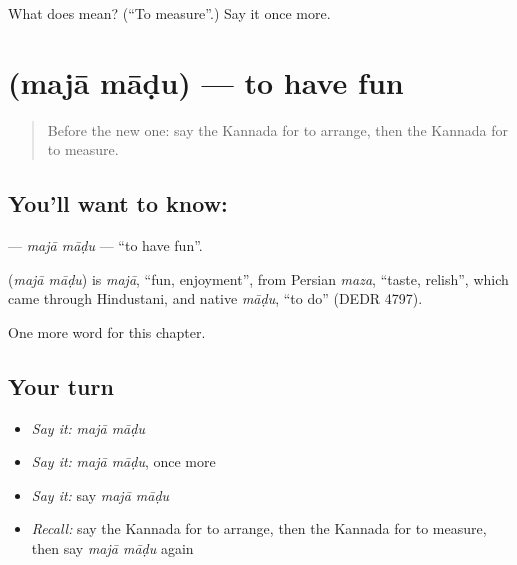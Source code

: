 \begin{tcolorbox}[breakable,colback=teal!4,colframe=teal!35!black,title={Before you move on}]
What does  mean? (\textquotedblleft{}To measure\textquotedblright{}.) Say it once more.
\end{tcolorbox}
\section[\texorpdfstring{\kn{ಮಜಾ} \kn{ಮಾಡು} (majā māḍu)}{ಮಜಾ ಮಾಡು (majā māḍu)}]{  (majā māḍu) — to have fun}

\label{lesson:KA-C204-maja-madu}



\begin{quote}
Before the new one: say the Kannada for to arrange, then the Kannada for to measure.
\end{quote}

\subsection*{You'll want to know:  }
\textbf{ } — \emph{majā māḍu} — \textquotedblleft{}to have fun\textquotedblright{}.

\begin{cousinweb}
\textbf{ } (\emph{majā māḍu}) is \emph{majā}, \textquotedblleft{}fun, enjoyment\textquotedblright{}, from Persian \emph{maza}, \textquotedblleft{}taste, relish\textquotedblright{}, which came through Hindustani, and native \emph{māḍu}, \textquotedblleft{}to do\textquotedblright{} (DEDR 4797).
\end{cousinweb}

\begin{grammarlens}[title={What you've built}]
One more word for this chapter.
\end{grammarlens}

\subsection*{Your turn}
\begin{itemize}
\raggedright
  \item \emph{Say it:} \emph{majā māḍu}
  \item \emph{Say it:} \emph{majā māḍu}, once more
  \item \emph{Say it:} say \emph{majā māḍu}
  \item \emph{Recall:} say the Kannada for to arrange, then the Kannada for to measure, then say \emph{majā māḍu} again
\end{itemize}

